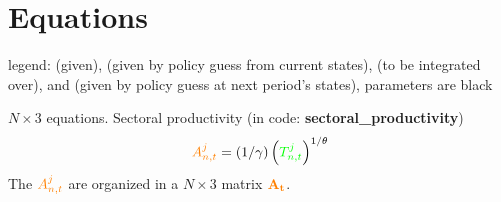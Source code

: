\documentclass[12pt, bibtotoc, tablecaptionabove, figurecaptionabove, fleqn]{article}
\newcommand{\cl}[1]{{\color{orange}{#1}}}
\newcommand{\st}[1]{{\color{green}{#1}}}
\newcommand{\stnext}[1]{{\color{magenta}{#1}}}
\newcommand{\clnext}[1]{{\color{blue}{#1}}}
\begin{document}
\section{Equations}

legend: \st{states in green} (given), \cl{controls in orange} (given by policy guess from current states), \stnext{next period's exogenous states in magenta} (to be integrated over), and \clnext{next period's controls in blue} (given by policy guess at next period's states), parameters are black\vspace{5mm}

\noindent $N \times 3$ equations. Sectoral productivity (in code: {\bf{sectoral\_productivity}})
\begin{equation}
\cl{A_{n, t}^{j}}=(1 / \gamma)\left(\st{T_{n, t}^{j}}\right)^{1 / \theta}
\end{equation}
The $\cl{A^j_{n,t}}$ are organized in a $ N \times 3$ matrix $\mathbf{\cl{A_t}}$.
\end{document}
